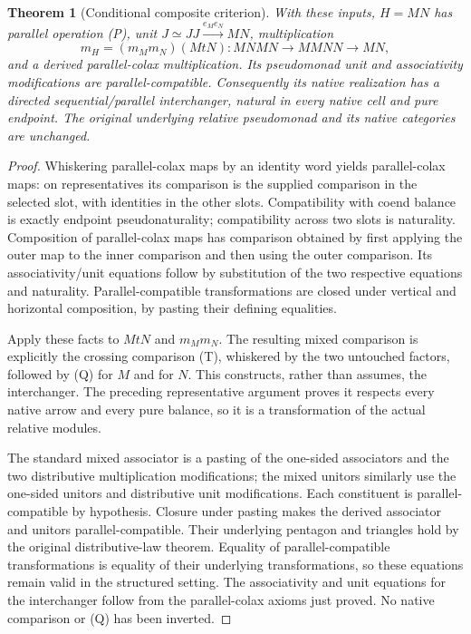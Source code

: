 \documentclass[11pt]{article}
\newtheorem{theorem}{Theorem}
\begin{document}
\begin{theorem}[Conditional composite criterion]
With these inputs, $H=MN$ has parallel operation (P), unit $J\simeq JJ\xrightarrow{e_Me_N}MN$, multiplication
\[
 m_H=(m_Mm_N)(MtN):MNMN\longrightarrow MMNN\longrightarrow MN,
\]
and a derived parallel-colax multiplication. Its pseudomonad unit and associativity modifications are parallel-compatible. Consequently its native realization has a directed sequential/parallel interchanger, natural in every native cell and pure endpoint. The original underlying relative pseudomonad and its native categories are unchanged.
\end{theorem}
\begin{proof}
Whiskering parallel-colax maps by an identity word yields parallel-colax maps: on representatives its comparison is the supplied comparison in the selected slot, with identities in the other slots. Compatibility with coend balance is exactly endpoint pseudonaturality; compatibility across two slots is naturality. Composition of parallel-colax maps has comparison obtained by first applying the outer map to the inner comparison and then using the outer comparison. Its associativity/unit equations follow by substitution of the two respective equations and naturality. Parallel-compatible transformations are closed under vertical and horizontal composition, by pasting their defining equalities.

Apply these facts to $MtN$ and $m_Mm_N$. The resulting mixed comparison is explicitly the crossing comparison (T), whiskered by the two untouched factors, followed by (Q) for $M$ and for $N$. This constructs, rather than assumes, the interchanger. The preceding representative argument proves it respects every native arrow and every pure balance, so it is a transformation of the actual relative modules.

The standard mixed associator is a pasting of the one-sided associators and the two distributive multiplication modifications; the mixed unitors similarly use the one-sided unitors and distributive unit modifications. Each constituent is parallel-compatible by hypothesis. Closure under pasting makes the derived associator and unitors parallel-compatible. Their underlying pentagon and triangles hold by the original distributive-law theorem. Equality of parallel-compatible transformations is equality of their underlying transformations, so these equations remain valid in the structured setting. The associativity and unit equations for the interchanger follow from the parallel-colax axioms just proved. No native comparison or (Q) has been inverted.
\end{proof}
\end{document}
